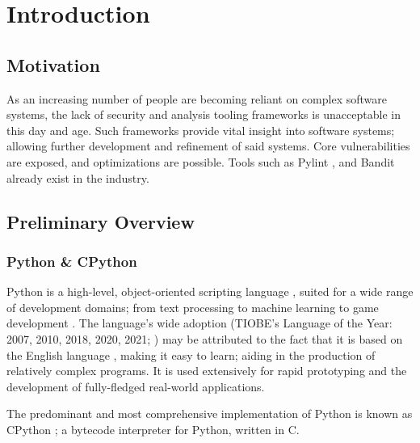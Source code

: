 \chapter{Introduction}


    \section{Motivation} %
    \par As an increasing number of people are becoming reliant on complex software systems, the lack of security and analysis
    tooling frameworks is unacceptable in this day and age. Such frameworks provide vital insight into software systems;
    allowing further development and refinement of said systems. Core vulnerabilities are exposed, and optimizations are possible.
    Tools such as Pylint \cite[]{pylint2021}, and Bandit \cite[]{bandit2022} already exist in the industry.

    \section{Preliminary Overview}
    \subsection{Python \& CPython}
    \par Python is a high-level, object-oriented scripting language \cite[]{lutz2001programming}, 
    suited for a wide range of development domains; from text processing \cite[]{bonta2019comprehensive} to 
    machine learning \cite[]{tensorflowTour} to game development \cite[]{sweigart2012making}. 
    The language's wide adoption (TIOBE's Language of the Year: 2007, 2010, 2018, 2020, 2021; \cite[]{tiobe2022index}) 
    may be attributed to the fact that it is based on the English language \cite[]{saabith2019python}, 
    making it easy to learn; aiding in the production of relatively complex programs. It is used extensively for rapid prototyping and the development of fully-fledged real-world applications.

    \par The predominant and most comprehensive implementation of Python is known as CPython \cite[]{van2021python}; a bytecode interpreter for Python, written in C.

